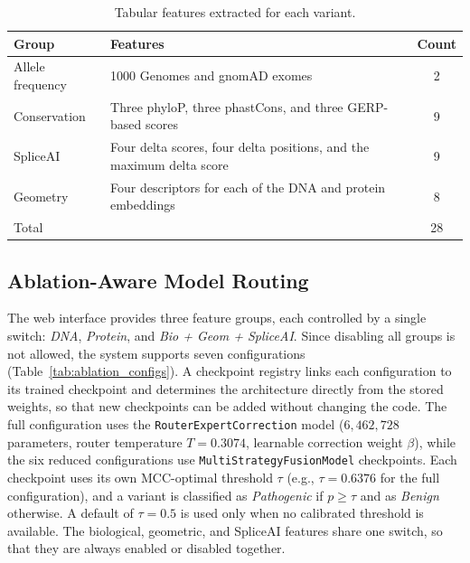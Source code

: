 \begin{table}[htbp]
    \centering
    \caption{Tabular features extracted for each variant.}
    \label{tab:tabular_features}
    \begin{tabular}{lp{}c}
        \toprule
        \textbf{Group} & \textbf{Features} & \textbf{Count} \\
        \midrule
        Allele frequency & 1000 Genomes and gnomAD exomes & 2 \\
        Conservation & Three phyloP, three phastCons, and three GERP-based scores & 9 \\
        SpliceAI & Four delta scores, four delta positions, and the maximum delta score & 9 \\
        Geometry & Four descriptors for each of the DNA and protein embeddings & 8 \\
        \midrule
        Total & & 28 \\
        \bottomrule
    \end{tabular}
\end{table}

\subsection{Ablation-Aware Model Routing}

The web interface provides three feature groups, each controlled by a single switch: \textit{DNA}, \textit{Protein}, and \textit{Bio + Geom + SpliceAI}. Since disabling all groups is not allowed, the system supports seven configurations (Table~\ref{tab:ablation_configs}). A checkpoint registry links each configuration to its trained checkpoint and determines the architecture directly from the stored weights, so that new checkpoints can be added without changing the code. The full configuration uses the \texttt{RouterExpertCorrection} model ($6{,}462{,}728$ parameters, router temperature $T = 0.3074$, learnable correction weight $\beta$), while the six reduced configurations use \texttt{MultiStrategyFusionModel} checkpoints. Each checkpoint uses its own MCC-optimal threshold $\tau$ (e.g., $\tau = 0.6376$ for the full configuration), and a variant is classified as \textit{Pathogenic} if $p \geq \tau$ and as \textit{Benign} otherwise. A default of $\tau = 0.5$ is used only when no calibrated threshold is available. The biological, geometric, and SpliceAI features share one switch, so that they are always enabled or disabled together.

